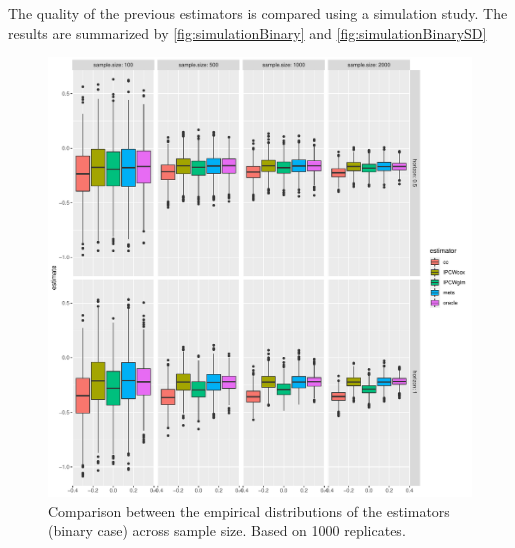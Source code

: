 \documentclass[12pt]{article}
\begin{document}
The quality of the previous estimators is compared using a simulation
study. The results are summarized by \autoref{fig:simulationBinary} and \autoref{fig:simulationBinarySD} 
\begin{figure}[!h]
\centering
\includegraphics[width=\textwidth]{./figures/simStudy-bin-bias.pdf}
\caption{\label{fig:simulationBinary}Comparison between the empirical distributions of the estimators (binary case) across sample size. Based on 1000 replicates.}
\end{figure}
\end{document}
